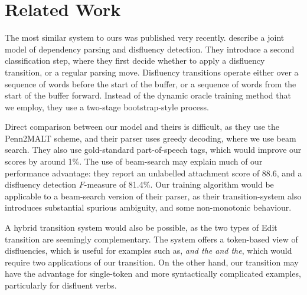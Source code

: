 \documentclass[11pt,letterpaper]{article}
\begin{document}
\section{Related Work}

The most similar system to ours was published very recently.
\citet{rasooli:13} describe a joint model of dependency
parsing and disfluency detection. They introduce a second classification step,
where they first decide whether to apply a disfluency transition, or a regular
parsing move. Disfluency transitions operate either over a sequence of words
before the start of the buffer, or a sequence of words from the start of the
buffer forward. Instead of the dynamic oracle training method that we employ,
they use a two-stage bootstrap-style process.

Direct comparison between our model and theirs is difficult,
as they use the Penn2MALT scheme, and their parser uses greedy decoding, where we use
beam search. They also use gold-standard part-of-speech tags, which would
improve our scores by around 1\%.
The use of beam-search may explain much of our performance advantage:
they report an unlabelled attachment score of 88.6, and a disfluency detection
$F$-measure of 81.4\%.  Our training algorithm would be applicable to a
beam-search version of their parser, as their transition-system also introduces
substantial spurious ambiguity, and some non-monotonic behaviour.

A hybrid transition system would also be possible, as the two types of Edit
transition are seemingly complementary. The \citeauthor{rasooli:13} system offers
a token-based view of disfluencies, which is useful for examples such as,
\emph{and the and the}, which would require two applications of our transition.
On the other hand, our transition may have the advantage for single-token and
more syntactically complicated examples, particularly for disfluent verbs.

\end{document}
